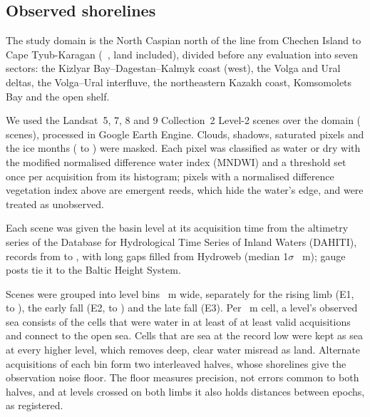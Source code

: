 
\subsection{Observed shorelines}
The study domain is the North Caspian north of the line from Chechen Island to Cape Tyub-Karagan (~\kmsq{}, land included), divided before any evaluation into seven sectors: the Kizlyar Bay--Dagestan--Kalmyk coast (west), the Volga and Ural deltas, the Volga--Ural interfluve, the northeastern Kazakh coast, Komsomolets Bay and the open shelf.

We used the Landsat~5, 7, 8 and 9 Collection~2 Level-2 scenes over the domain ( scenes)\citep{usgs_l45tm_c2l2,usgs_l7etm_c2l2,usgs_l89oli_c2l2}, processed in Google Earth Engine\citep{gorelick2017}. Clouds, shadows, saturated pixels and the ice months ( to ) were masked. Each pixel was classified as water or dry with the modified normalised difference water index (MNDWI)\citep{xu2006} and a threshold set once per acquisition from its histogram; pixels with a normalised difference vegetation index above  are emergent reeds, which hide the water's edge, and were treated as unobserved.

Each scene was given the basin level at its acquisition time from the altimetry series of the Database for Hydrological Time Series of Inland Waters (DAHITI)\citep{schwatke2015},  records from  to , with long gaps filled from Hydroweb\citep{hydrowebwl,cretaux2011} (median 1$\sigma$ ~m); gauge posts\citep{caspcom2026} tie it to the Baltic Height System.

Scenes were grouped into level bins ~m wide, separately for the rising limb (E1, to ), the early fall (E2, to ) and the late fall (E3). Per ~m cell, a level's observed sea consists of the cells that were water in at least  of at least  valid acquisitions and connect to the open sea. Cells that are sea at the record low were kept as sea at every higher level, which removes deep, clear water misread as land. Alternate acquisitions of each bin form two interleaved halves, whose shorelines give the observation noise floor. The floor measures precision, not errors common to both halves, and at levels crossed on both limbs it also holds distances between epochs, as registered.

